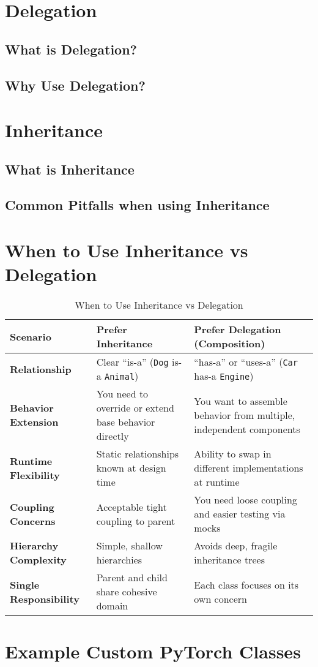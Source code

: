 
	\section{Delegation}
		\subsection{What is Delegation?}
		\subsection{Why Use Delegation?}
	\section{Inheritance}
		\subsection{What is Inheritance}
		\subsection{Common Pitfalls when using Inheritance}
	\section{When to Use Inheritance vs Delegation}
	
		\begin{table}[H]
			\centering
			\caption{When to Use Inheritance vs Delegation}
			\label{tab:inheritance-delegation}
			\begin{tabularx}{\textwidth}{>{\bfseries}l X X}
				\toprule
				Scenario & Prefer Inheritance & Prefer Delegation (Composition) \\
				\midrule
				Relationship &
				Clear “is-a” (\texttt{Dog} is-a \texttt{Animal}) &
				“has-a” or “uses-a” (\texttt{Car} has-a \texttt{Engine}) \\
				Behavior Extension &
				You need to override or extend base behavior directly &
				You want to assemble behavior from multiple, independent components \\
				Runtime Flexibility &
				Static relationships known at design time &
				Ability to swap in different implementations at runtime \\
				Coupling Concerns &
				Acceptable tight coupling to parent &
				You need loose coupling and easier testing via mocks \\
				Hierarchy Complexity &
				Simple, shallow hierarchies &
				Avoids deep, fragile inheritance trees \\
				Single Responsibility &
				Parent and child share cohesive domain &
				Each class focuses on its own concern \\
				\bottomrule
			\end{tabularx}
		\end{table}
	\section{Example Custom PyTorch Classes}